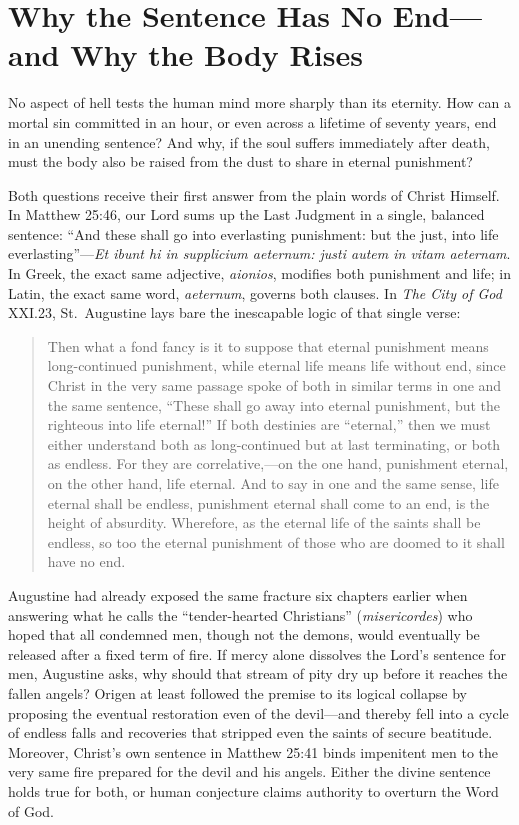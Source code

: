 \section{Why the Sentence Has No End---and Why the Body Rises}

No aspect of hell tests the human mind more sharply than its eternity. How can a mortal sin committed in an hour, or even across a lifetime of seventy years, end in an unending sentence? And why, if the soul suffers immediately after death, must the body also be raised from the dust to share in eternal punishment?

Both questions receive their first answer from the plain words of Christ Himself. In Matthew 25:46, our Lord sums up the Last Judgment in a single, balanced sentence: ``And these shall go into everlasting punishment: but the just, into life everlasting''---\textit{Et ibunt hi in supplicium aeternum: justi autem in vitam aeternam}. In Greek, the exact same adjective, \textit{aionios}, modifies both punishment and life; in Latin, the exact same word, \textit{aeternum}, governs both clauses. In \textit{The City of God} XXI.23, St.\ Augustine lays bare the inescapable logic of that single verse:

\begin{quote}
Then what a fond fancy is it to suppose that eternal punishment means long-continued punishment, while eternal life means life without end, since Christ in the very same passage spoke of both in similar terms in one and the same sentence, ``These shall go away into eternal punishment, but the righteous into life eternal!'' If both destinies are ``eternal,'' then we must either understand both as long-continued but at last terminating, or both as endless. For they are correlative,---on the one hand, punishment eternal, on the other hand, life eternal. And to say in one and the same sense, life eternal shall be endless, punishment eternal shall come to an end, is the height of absurdity. Wherefore, as the eternal life of the saints shall be endless, so too the eternal punishment of those who are doomed to it shall have no end.
\end{quote}

Augustine had already exposed the same fracture six chapters earlier when answering what he calls the ``tender-hearted Christians'' (\textit{misericordes}) who hoped that all condemned men, though not the demons, would eventually be released after a fixed term of fire. If mercy alone dissolves the Lord's sentence for men, Augustine asks, why should that stream of pity dry up before it reaches the fallen angels? Origen at least followed the premise to its logical collapse by proposing the eventual restoration even of the devil---and thereby fell into a cycle of endless falls and recoveries that stripped even the saints of secure beatitude. Moreover, Christ's own sentence in Matthew 25:41 binds impenitent men to the very same fire prepared for the devil and his angels. Either the divine sentence holds true for both, or human conjecture claims authority to overturn the Word of God.

